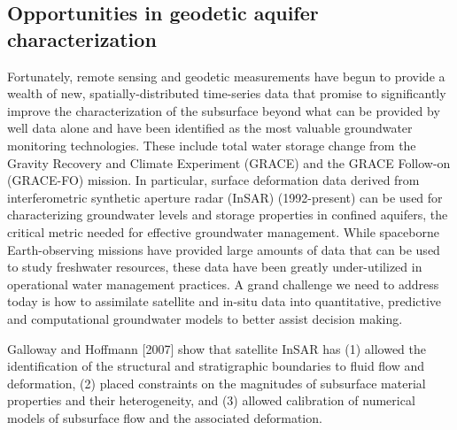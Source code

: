 \documentclass[11pt,final]{article}%
\begin{document}
\subsection{Opportunities in geodetic aquifer characterization}
Fortunately, remote sensing and geodetic measurements have begun to provide a wealth of new, spatially-distributed time-series data that promise to significantly improve the characterization of the subsurface beyond what can be provided by well data alone and have been identified as the most valuable groundwater monitoring technologies. These include total water storage change from the Gravity Recovery and Climate Experiment (GRACE) and the GRACE Follow-on (GRACE-FO) mission. In particular, surface deformation data derived from interferometric synthetic aperture radar (InSAR) (1992-present) can be used for characterizing groundwater levels and storage properties in confined aquifers, the critical metric needed for effective groundwater management. While spaceborne Earth-observing missions have provided large amounts of data that can be used to study freshwater resources, these data have been greatly under-utilized in operational water management practices. A grand challenge we need to address today is how to assimilate satellite and in-situ data into quantitative, predictive and computational groundwater models to better assist decision making.

Galloway and Hoffmann [2007] \cite{Galloway2006a} show that satellite InSAR has (1) allowed the identification of the structural and stratigraphic boundaries to fluid flow and deformation, (2) placed constraints on the magnitudes of subsurface material properties and their heterogeneity, and (3) allowed calibration of numerical models of subsurface flow and the associated deformation.


\end{document}
